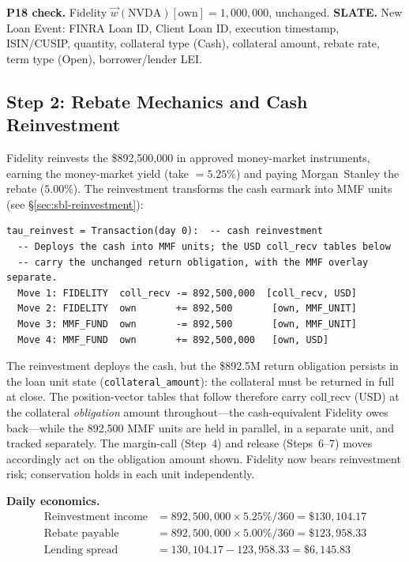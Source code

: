 \documentclass[11pt,a4paper]{article}
\begin{document}
\noindent\textbf{P18 check.} Fidelity $\vec{w}(\text{NVDA})[\mathrm{own}] = 1{,}000{,}000$, unchanged. \checkmark\quad
\textbf{SLATE.} New Loan Event: FINRA Loan ID, Client Loan ID, execution timestamp, ISIN/CUSIP, quantity, collateral type (Cash), collateral amount, rebate rate, term type (Open), borrower/lender LEI.

\subsection{Step 2: Rebate Mechanics and Cash Reinvestment}
\label{sec:us-step2}

Fidelity reinvests the \$892{,}500{,}000 in approved money-market instruments, earning the money-market yield (take $= 5.25\%$) and paying Morgan~Stanley the rebate ($5.00\%$). The reinvestment transforms the cash earmark into MMF units (see \S\ref{sec:sbl-reinvestment}):

\begin{lstlisting}
tau_reinvest = Transaction(day 0):  -- cash reinvestment
  -- Deploys the cash into MMF units; the USD coll_recv tables below
  -- carry the unchanged return obligation, with the MMF overlay separate.
  Move 1: FIDELITY  coll_recv -= 892,500,000  [coll_recv, USD]
  Move 2: FIDELITY  own       += 892,500       [own, MMF_UNIT]
  Move 3: MMF_FUND  own       -= 892,500       [own, MMF_UNIT]
  Move 4: MMF_FUND  own       += 892,500,000   [own, USD]
\end{lstlisting}

\noindent The reinvestment deploys the cash, but the \$892.5M return obligation persists in the loan unit state (\texttt{collateral\_amount}): the collateral must be returned in full at close. The position-vector tables that follow therefore carry $\mathrm{coll\_recv}$ (USD) at the collateral \emph{obligation} amount throughout---the cash-equivalent Fidelity owes back---while the 892{,}500 MMF units are held in parallel, in a separate unit, and tracked separately. The margin-call (Step~4) and release (Steps~6--7) moves accordingly act on the obligation amount shown. Fidelity now bears reinvestment risk; conservation holds in each unit independently.

\medskip
\noindent\textbf{Daily economics.}
\begin{align*}
\text{Reinvestment income} &= 892{,}500{,}000 \times 5.25\% / 360 = \$130{,}104.17 \\
\text{Rebate payable} &= 892{,}500{,}000 \times 5.00\% / 360 = \$123{,}958.33 \\
\text{Lending spread} &= 130{,}104.17 - 123{,}958.33 = \$6{,}145.83
\end{align*}
\end{document}
